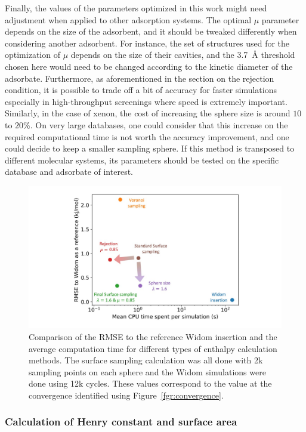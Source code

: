 \documentclass[main]{subfiles}
\begin{document}
Finally, the values of the parameters optimized in this work might need adjustment when applied to other adsorption systems. The optimal $\mu$ parameter depends on the size of the adsorbent, and it should be tweaked differently when considering another adsorbent. For instance, the set of structures used for the optimization of $\mu$ depends on the size of their cavities, and the \SI{3.7}{\angstrom} threshold chosen here would need to be changed according to the kinetic diameter of the adsorbate. Furthermore, as aforementioned in the section on the rejection condition, it is possible to trade off a bit of accuracy for faster simulations especially in high-throughput screenings where speed is extremely important. Similarly, in the case of xenon, the cost of increasing the sphere size is around $10$ to {$20$\%}. On very large databases, one could consider that this increase on the required computational time is not worth the accuracy improvement, and one could decide to keep a smaller sampling sphere. If this method is transposed to different molecular systems, its parameters should be tested on the specific database and adsorbate of interest.

\begin{figure}[ht]
  \centering
    \includegraphics[width=\linewidth]{figures/3-fastsim/methods_comparison.jpg}
    \caption{Comparison of the RMSE to the reference Widom insertion and the average computation time for different types of enthalpy calculation methods. The surface sampling calculation was all done with 2k sampling points on each sphere and the Widom simulations were done using 12k cycles. These values correspond to the value at the convergence identified using Figure~\ref{fgr:convergence}. }\label{fgr:sumup}
  \end{figure}

\subsubsection{Calculation of Henry constant and surface area}
\end{document}
